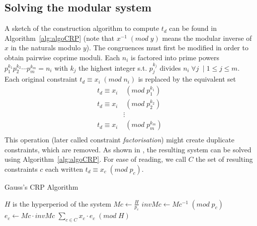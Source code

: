 \documentclass[conference]{IEEEtran}
\begin{document}
	\subsection{Solving the modular system}
		A sketch of the construction algorithm to compute $t_d$ can be found in
		Algorithm~\ref{alg:algoCRP} (note that $x^{-1} \; (mod \; y)$ means the
		modular inverse of $x$ in the naturals modulo $y$). The congruences must
		first be modified in order to obtain pairwise coprime moduli. Each $n_i$
		is factored into prime powers $p^{k_1}_1 p^{k_2}_2 \cdots p^{k_m}_m = n_i$
		with $k_j$ the highest integer s.t. $p^{k_j}_j$ divides $n_i \; \forall j
		\; \mid 1 \leqslant j \leqslant m$. Each original constraint $t_d \equiv x_i
		\; (mod \; n_i)$ is replaced by the equivalent set \cite{knuth1969art}
		\begin{equation*}
			\begin{split}
				t_d \equiv x_i 	& \; (mod \; p^{k_1}_1) \\
				t_d \equiv x_i 	& \; (mod \; p^{k_2}_2) \\
								& \vdots \\
				t_d \equiv x_i 	& \; (mod \; p^{k_m}_m) \\
			\end{split}
		\end{equation*}
		This operation (later called constraint \emph{factorisation}) might create
		duplicate constraints, which are removed.
		As shown in \cite{knuth1969art}, the resulting system can be solved using
		Algorithm~\ref{alg:algoCRP}. For ease of reading, we call $C$ the set of
		resulting constraints $c$ each written $t_d \equiv x_c \; (mod \;
		p_c)$.

		\begin{algorithm}
			\caption{Gauss's CRP Algorithm}
			\label{alg:algoCRP}
			\begin{algorithmic}[1]
				\REQUIRE $H$ is the hyperperiod of the system
					\STATE $Mc \leftarrow \frac{H}{p_c}$
					\STATE $invMc \leftarrow Mc^{-1} \; (mod \; p_c)$
					\STATE $e_c \leftarrow Mc \cdot invMc$
				\ENDFOR
				\RETURN $\sum\limits_{c \in C}{x_c \cdot e_c} \; (mod \; H)$
			\end{algorithmic}
		\end{algorithm}
\end{document}
